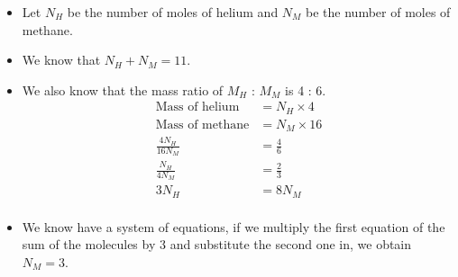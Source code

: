 \documentclass[a4paper,12pt]{article}
\begin{document}
\begin{itemize}
  \item Let $N_H$ be the number of moles of helium and $N_M$ be the number of moles of methane.
  \item We know that $N_H + N_M = 11$.
  \item We also know that the mass ratio of $M_H$ : $M_M$ is 4 : 6.
        \begin{align*}
          \text{Mass of helium}  & = N_H \times 4  \\
          \text{Mass of methane} & = N_M \times 16 \\
          \frac{4N_H}{16N_M}     & = \frac{4}{6}   \\
          \frac{N_H}{4N_M}       & = \frac{2}{3}   \\
          3N_H                   & = 8N_M          \\
        \end{align*}
  \item We know have a system of equations, if we multiply the first equation of the sum of the molecules by 3 and substitute the second one in, we obtain $N_M = 3$.
\end{itemize}
\end{document}

